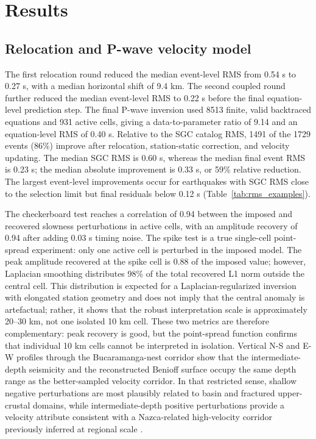 \documentclass[review,authoryear]{elsarticle}
\begin{document}
\section{Results}
\subsection{Relocation and P-wave velocity model}
The first relocation round reduced the median event-level RMS from 0.54 s to 0.27 s, with a median horizontal shift of 9.4 km. The second coupled round further reduced the median event-level RMS to 0.22 s before the final equation-level prediction step. The final P-wave inversion used 8513 finite, valid backtraced equations and 931 active cells, giving a data-to-parameter ratio of 9.14 and an equation-level RMS of 0.40 s. Relative to the SGC catalog RMS, 1491 of the 1729 events (86\%) improve after relocation, station-static correction, and velocity updating. The median SGC RMS is 0.60 s, whereas the median final event RMS is 0.23 s; the median absolute improvement is 0.33 s, or 59\% relative reduction. The largest event-level improvements occur for earthquakes with SGC RMS close to the selection limit but final residuals below 0.12 s (Table~\ref{tab:rms_examples}).

The checkerboard test reaches a correlation of 0.94 between the imposed and recovered slowness perturbations in active cells, with an amplitude recovery of 0.94 after adding 0.03 s timing noise. The spike test is a true single-cell point-spread experiment: only one active cell is perturbed in the imposed model. The peak amplitude recovered at the spike cell is 0.88 of the imposed value; however, Laplacian smoothing distributes 98\% of the total recovered L1 norm outside the central cell. This distribution is expected for a Laplacian-regularized inversion with elongated station geometry and does not imply that the central anomaly is artefactual; rather, it shows that the robust interpretation scale is approximately 20--30 km, not one isolated 10 km cell. These two metrics are therefore complementary: peak recovery is good, but the point-spread function confirms that individual 10 km cells cannot be interpreted in isolation. Vertical N-S and E-W profiles through the Bucaramanga-nest corridor show that the intermediate-depth seismicity and the reconstructed Benioff surface occupy the same depth range as the better-sampled velocity corridor. In that restricted sense, shallow negative perturbations are most plausibly related to basin and fractured upper-crustal domains, while intermediate-depth positive perturbations provide a velocity attribute consistent with a Nazca-related high-velocity corridor previously inferred at regional scale \citep{Poveda2018,Londono2020Velocity,Syracuse2016}.
\end{document}
